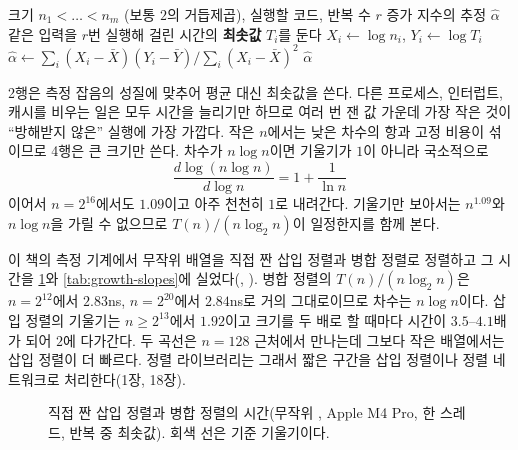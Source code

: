 \begin{algorithm}[htbp]
\begin{algorithmic}[1]
\Require 크기 $n_1<\dots<n_m$ (보통 $2$의 거듭제곱), 실행할 코드, 반복 수 $r$
\Ensure 증가 지수의 추정 $\hat\alpha$
  \State 같은 입력을 $r$번 실행해 걸린 시간의 \textbf{최솟값} $T_i$를 둔다 
\EndFor
\State $X_i\gets\log n_i$, $Y_i\gets\log T_i$ 
\State $\hat\alpha\gets\sum_i(X_i-\bar X)(Y_i-\bar Y)\big/\sum_i(X_i-\bar X)^2$
\State \Return $\hat\alpha$
\end{algorithmic}
\caption{측정에서 증가 지수 추정하기}
\label{alg:loglog}
\end{algorithm}

2행은 측정 잡음의 성질에 맞추어 평균 대신 최솟값을 쓴다. 다른 프로세스, 인터럽트, 캐시를 비우는 일은 모두 시간을 늘리기만 하므로 여러 번 잰 값 가운데 가장 작은 것이 ``방해받지 않은'' 실행에 가장 가깝다. 작은 $n$에서는 낮은 차수의 항과 고정 비용이 섞이므로 4행은 큰 크기만 쓴다. 차수가 $n\log n$이면 기울기가 $1$이 아니라 국소적으로
\[
\frac{d\log(n\log n)}{d\log n}=1+\frac{1}{\ln n}
\]
이어서 $n=2^{16}$에서도 $1.09$이고 아주 천천히 $1$로 내려간다. 기울기만 보아서는 $n^{1.09}$와 $n\log n$을 가릴 수 없으므로 $T(n)/(n\log_2n)$이 일정한지를 함께 본다.

이 책의 측정 기계에서 무작위  배열을 직접 짠 삽입 정렬과 병합 정렬로 정렬하고 그 시간을 \cref{fig:sort-growth}와 \cref{tab:growth-slopes}에 실었다(, ). 병합 정렬의 $T(n)/(n\log_2n)$은 $n=2^{12}$에서 $2.83$ns, $n=2^{20}$에서 $2.84$ns로 거의 그대로이므로 차수는 $n\log n$이다. 삽입 정렬의 기울기는 $n\ge2^{13}$에서 $1.92$이고 크기를 두 배로 할 때마다 시간이 $3.5$--$4.1$배가 되어 $2$에 다가간다. 두 곡선은 $n=128$ 근처에서 만나는데 그보다 작은 배열에서는 삽입 정렬이 더 빠르다. 정렬 라이브러리는 그래서 짧은 구간을 삽입 정렬이나 정렬 네트워크로 처리한다(1장, 18장).

\begin{figure}[htbp]
\centering
{}
\caption{직접 짠 삽입 정렬과 병합 정렬의 시간(무작위 , Apple M4 Pro, 한 스레드, 반복 중 최솟값). 회색 선은 기준 기울기이다.}
\label{fig:sort-growth}
\end{figure}

